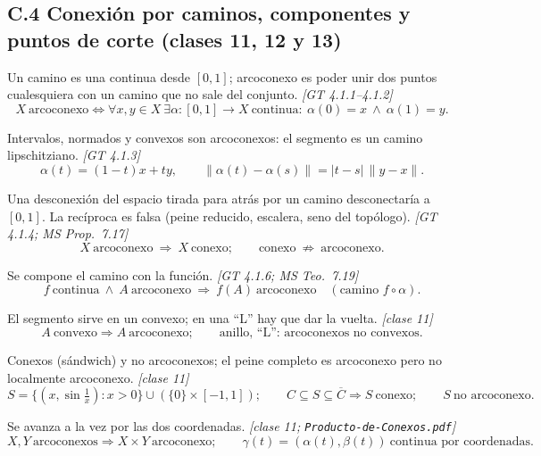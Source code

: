 \documentclass[11pt,a4paper]{article}
\theoremstyle{definition}
\theoremstyle{plain}
\newcommand{\fnt}[1]{{\normalfont\small\itshape\color{gray!150!black}[#1]}}
\newcommand{\cl}[1]{\overline{#1}}
\newcommand{\norm}[1]{\lVert #1 \rVert}
\begin{document}
\subsection*{C.4 Conexión por caminos, componentes y puntos de corte \normalfont\small (clases 11, 12 y 13)}

\begin{itemize}[leftmargin=1.3em,itemsep=3pt]

 Un camino es una continua desde $[0,1]$; arcoconexo es poder unir dos puntos cualesquiera con un camino que no sale del conjunto. \fnt{GT 4.1.1--4.1.2}
\[ X\ \text{arcoconexo}\iff \forall x,y\in X\ \exists\alpha:[0,1]\to X\ \text{continua}:\ \alpha(0)=x\ \wedge\ \alpha(1)=y. \]

 Intervalos, normados y convexos son arcoconexos: el segmento es un camino lipschitziano. \fnt{GT 4.1.3}
\[ \alpha(t)=(1-t)x+ty,\qquad \norm{\alpha(t)-\alpha(s)}=|t-s|\,\norm{y-x}. \]

 Una desconexión del espacio tirada para atrás por un camino desconectaría a $[0,1]$. La recíproca es falsa (peine reducido, escalera, seno del topólogo). \fnt{GT 4.1.4; MS Prop.\ 7.17}
\[ X\ \text{arcoconexo}\ \Rightarrow\ X\ \text{conexo};\qquad \text{conexo}\ \not\Rightarrow\ \text{arcoconexo}. \]

 Se compone el camino con la función. \fnt{GT 4.1.6; MS Teo.\ 7.19}
\[ f\ \text{continua}\ \wedge\ A\ \text{arcoconexo}\ \Rightarrow\ f(A)\ \text{arcoconexo}\quad(\text{camino } f\circ\alpha). \]

 El segmento sirve en un convexo; en una ``L'' hay que dar la vuelta. \fnt{clase 11}
\[ A\ \text{convexo}\Rightarrow A\ \text{arcoconexo};\qquad \text{anillo, ``L'': arcoconexos no convexos}. \]

 Conexos (sándwich) y no arcoconexos; el peine completo es arcoconexo pero no localmente arcoconexo. \fnt{clase 11}
\[ S=\{(x,\sin\tfrac1x):x>0\}\cup(\{0\}\times[-1,1]);\qquad C\subseteq S\subseteq\cl C\Rightarrow S\ \text{conexo};\qquad S\ \text{no arcoconexo}. \]

 Se avanza a la vez por las dos coordenadas. \fnt{clase 11; \texttt{Producto-de-Conexos.pdf}}
\[ X,Y\ \text{arcoconexos}\Rightarrow X\times Y\ \text{arcoconexo};\qquad \gamma(t)=(\alpha(t),\beta(t))\ \text{continua por coordenadas}. \]


\end{itemize}
\end{document}
